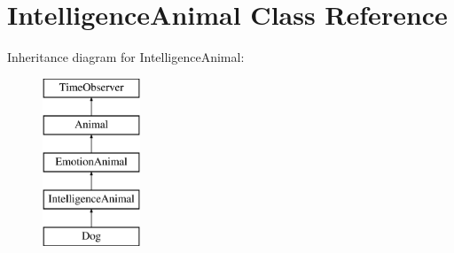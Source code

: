 \hypertarget{class_intelligence_animal}{}\section{Intelligence\+Animal Class Reference}
\label{class_intelligence_animal}
Inheritance diagram for Intelligence\+Animal\+:\begin{figure}[H]
\begin{center}
\leavevmode
\includegraphics[height=5.000000cm]{class_intelligence_animal}
\end{center}
\end{figure}
